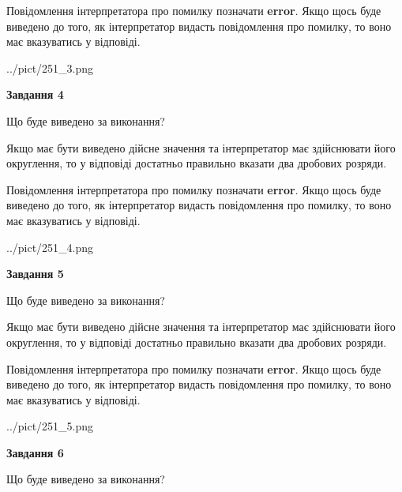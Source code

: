 \documentclass[12pt, ukrainian]{article}
\begin{document}
{\begin {Large}
Повідомлення інтерпретатора про помилку позначати \textbf{error}.
Якщо щось буде виведено до того, як інтерпретатор видасть повідомлення про помилку, 
то воно має вказуватись у відповіді. \par

\begin{center}
	{../pict/251_3.png}
\end{center}
\newpage

{\begin {center}\textbf{Завдання 4}\end {center}}\par
Що буде виведено за виконання? \par

Якщо має бути виведено дійсне значення та інтерпретатор має здійснювати його округлення, 
то у відповіді достатньо правильно вказати два дробових розряди.

Повідомлення інтерпретатора про помилку позначати \textbf{error}.
Якщо щось буде виведено до того, як інтерпретатор видасть повідомлення про помилку, 
то воно має вказуватись у відповіді. \par

\begin{center}
	{../pict/251_4.png}
\end{center}
\newpage

{\begin {center}\textbf{Завдання 5}\end {center}}\par
Що буде виведено за виконання? \par

Якщо має бути виведено дійсне значення та інтерпретатор має здійснювати його округлення, 
то у відповіді достатньо правильно вказати два дробових розряди.

Повідомлення інтерпретатора про помилку позначати \textbf{error}.
Якщо щось буде виведено до того, як інтерпретатор видасть повідомлення про помилку, 
то воно має вказуватись у відповіді. \par

\begin{center}
	{../pict/251_5.png}
\end{center}
\newpage

{\begin {center}\textbf{Завдання 6}\end {center}}\par
Що буде виведено за виконання? \par


\end{Large}}
\end{document}
